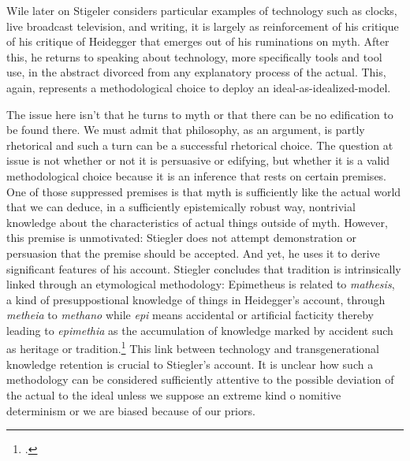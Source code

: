 \documentclass[letterpaper,notitlepage,12pt]{article}
\begin{document}
Wile later on Stigeler considers particular examples of technology such as
clocks, live broadcast television, and writing, it is largely as reinforcement
of his critique of his critique of Heidegger that emerges out of his ruminations
on myth.
After this, he returns to speaking about technology, more specifically tools and
tool use, in the abstract divorced from any explanatory process of the actual.
This, again, represents a methodological choice to deploy an
ideal-as-idealized-model.

The issue here isn't that he turns to myth or that there can be no edification
to be found there.
We must admit that philosophy, as an argument, is partly rhetorical and such a
turn can be a successful rhetorical choice.
The question at issue is not whether or not it is persuasive or edifying, but
whether it is a valid methodological choice because it is an inference that
rests on certain premises.
One of those suppressed premises is that myth is sufficiently like the actual
world that we can deduce, in a sufficiently epistemically robust way,
nontrivial knowledge about the characteristics of actual things outside of myth.
However, this premise is unmotivated: Stiegler does not attempt demonstration or
persuasion that the premise should be accepted.
And yet, he uses it to derive significant features of his account.
Stiegler concludes that tradition is intrinsically linked through an
etymological methodology: Epimetheus is related to \textit{mathesis}, a kind of
presuppostional knowledge of things in Heidegger's account, through
\textit{metheia} to \textit{methano} while \textit{epi} means accidental or
artificial facticity thereby leading to \textit{epimethia} as the accumulation
of knowledge marked by accident such as heritage or tradition.\footcite[p.
206--7]{stiegler_technics_1998}
This link between technology and transgenerational knowledge retention is
crucial to Stiegler's account.
It is unclear how such a methodology can be considered sufficiently attentive to
the possible deviation of the actual to the ideal unless we suppose an extreme
kind o nomitive determinism or we are biased because of our priors.
\end{document}
